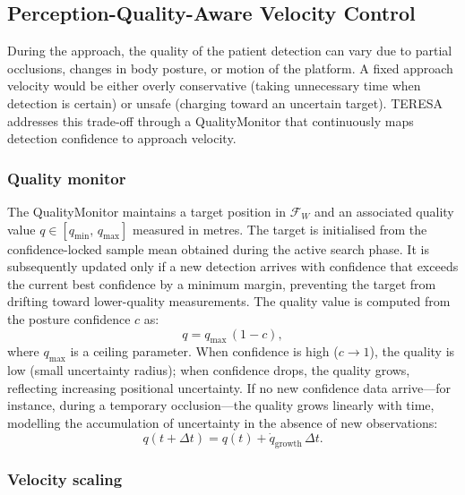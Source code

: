 \subsection{Perception-Quality-Aware Velocity Control}
\label{sec:quality_velocity}

During the approach, the quality of the patient detection can vary due to
partial occlusions, changes in body posture, or motion of the platform. A
fixed approach velocity would be either overly conservative (taking
unnecessary time when detection is certain) or unsafe (charging toward an
uncertain target). \ac{TERESA} addresses this trade-off through a
QualityMonitor that continuously maps detection confidence to approach
velocity.

\subsubsection{Quality monitor}

The QualityMonitor maintains a target position in $\mathcal{F}_W$ and an
associated quality value $q \in [q_{\min},\, q_{\max}]$ measured in metres.
The target is initialised from the confidence-locked sample mean obtained
during the active search phase. It is subsequently updated only if a new
detection arrives with confidence that exceeds the current best confidence
by a minimum margin, preventing the target from drifting toward lower-quality
measurements. The quality value is computed from the posture confidence
$c$ as:
\begin{equation}
  q = q_{\max}\,(1 - c),
  \label{eq:quality_confidence}
\end{equation}
where $q_{\max}$ is a ceiling parameter. When confidence is high
($c \to 1$), the quality is low (small uncertainty radius); when confidence
drops, the quality grows, reflecting increasing positional uncertainty.
If no new confidence data arrive---for instance, during a temporary
occlusion---the quality grows linearly with time, modelling the accumulation
of uncertainty in the absence of new observations:
\begin{equation}
  q(t + \Delta t) = q(t) + \dot{q}_{\mathrm{growth}}\,\Delta t.
  \label{eq:quality_growth}
\end{equation}

\subsubsection{Velocity scaling}

